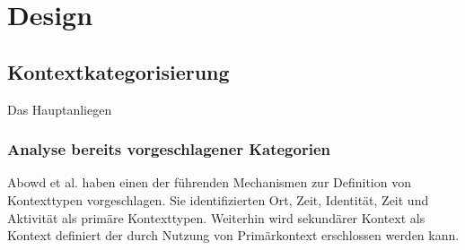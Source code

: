 \chapter{Design}%
\label{cha:design}

\section{Kontextkategorisierung}
Das Hauptanliegen 

\subsection{ Analyse bereits vorgeschlagener Kategorien} 
Abowd et al.\cite{abowd_towards_1999} haben einen der führenden Mechanismen zur Definition von Kontexttypen vorgeschlagen. Sie identifizierten Ort, Zeit, Identität, Zeit und Aktivität als primäre Kontexttypen. Weiterhin wird sekundärer Kontext als Kontext definiert der durch Nutzung von Primärkontext erschlossen werden kann.

